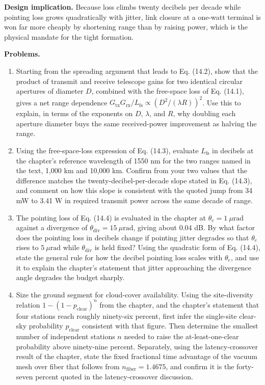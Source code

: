 \documentclass[
  11pt,
  openany,
  oneside]{book}
\begin{document}
\textbf{Design implication.} Because loss climbs twenty decibels per
decade while pointing loss grows quadratically with jitter, link closure
at a one-watt terminal is won far more cheaply by shortening range than
by raising power, which is the physical mandate for the tight formation.

\textbf{Problems.}

\begin{enumerate}
\def\labelenumi{\arabic{enumi}.}
\item
  Starting from the spreading argument that leads to Eq. (14.2), show
  that the product of transmit and receive telescope gains for two
  identical circular apertures of diameter \(D\), combined with the
  free-space loss of Eq. (14.1), gives a net range dependence
  \(G_{\mathrm{tx}}G_{\mathrm{rx}}/L_{\mathrm{fs}} \propto (D^2/(\lambda R))^2\).
  Use this to explain, in terms of the exponents on \(D\), \(\lambda\),
  and \(R\), why doubling each aperture diameter buys the same
  received-power improvement as halving the range.
\item
  Using the free-space-loss expression of Eq. (14.3), evaluate
  \(L_{\mathrm{fs}}\) in decibels at the chapter's reference wavelength
  of 1550 nm for the two ranges named in the text, 1,000 km and 10,000
  km. Confirm from your two values that the difference matches the
  twenty-decibel-per-decade slope stated in Eq. (14.3), and comment on
  how this slope is consistent with the quoted jump from 34 mW to 3.41 W
  in required transmit power across the same decade of range.
\item
  The pointing loss of Eq. (14.4) is evaluated in the chapter at
  \(\theta_e = 1\ \mu\mathrm{rad}\) against a divergence of
  \(\theta_{\mathrm{div}} = 15\ \mu\mathrm{rad}\), giving about 0.04 dB.
  By what factor does the pointing loss in decibels change if pointing
  jitter degrades so that \(\theta_e\) rises to \(5\ \mu\mathrm{rad}\)
  while \(\theta_{\mathrm{div}}\) is held fixed? Using the quadratic
  form of Eq. (14.4), state the general rule for how the decibel
  pointing loss scales with \(\theta_e\), and use it to explain the
  chapter's statement that jitter approaching the divergence angle
  degrades the budget sharply.
\item
  Size the ground segment for cloud-cover availability. Using the
  site-diversity relation \(1 - (1 - p_{\mathrm{clear}})^n\) from the
  chapter, and the chapter's statement that four stations reach roughly
  ninety-six percent, first infer the single-site clear-sky probability
  \(p_{\mathrm{clear}}\) consistent with that figure. Then determine the
  smallest number of independent stations \(n\) needed to raise the
  at-least-one-clear probability above ninety-nine percent. Separately,
  using the latency-crossover result of the chapter, state the fixed
  fractional time advantage of the vacuum mesh over fiber that follows
  from \(n_{\mathrm{fiber}} = 1.4675\), and confirm it is the
  forty-seven percent quoted in the latency-crossover discussion.
\end{enumerate}
\end{document}
